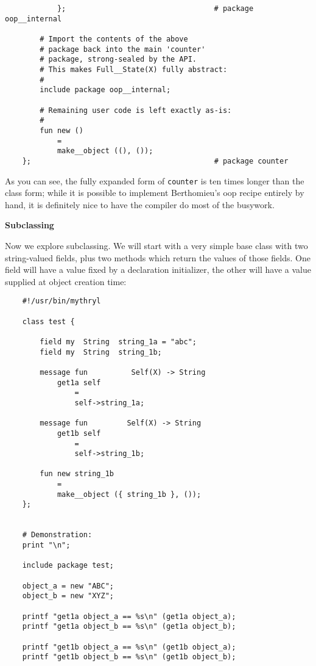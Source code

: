 \begin{verbatim}
            };                                  # package oop__internal

        # Import the contents of the above
        # package back into the main 'counter'
        # package, strong-sealed by the API.
        # This makes Full__State(X) fully abstract:
        #
        include package oop__internal;

        # Remaining user code is left exactly as-is:
        # 
        fun new ()
            =
            make__object ((), ());
    };                                          # package counter
\end{verbatim}

As you can see, the fully expanded form of {\tt counter} is ten times longer 
than the class form;  while it is possible to implement Berthomieu's oop recipe 
entirely by hand, it is definitely nice to have the compiler do most of the 
busywork.

{\bf Subclassing}

Now we explore subclassing.  We will start with a very simple base 
class with two string-valued fields, plus two methods which return the 
values of those fields.  One field will have a value fixed by a declaration 
initializer, the other will have a value supplied at object creation time:

\begin{verbatim}
    #!/usr/bin/mythryl

    class test {

        field my  String  string_1a = "abc";
        field my  String  string_1b;

        message fun          Self(X) -> String
            get1a self
                =
                self->string_1a;

        message fun         Self(X) -> String
            get1b self
                =
                self->string_1b;

        fun new string_1b
            =
            make__object ({ string_1b }, ());
    };


    # Demonstration:
    print "\n";

    include package test;

    object_a = new "ABC";
    object_b = new "XYZ";

    printf "get1a object_a == %s\n" (get1a object_a);
    printf "get1a object_b == %s\n" (get1a object_b);

    printf "get1b object_a == %s\n" (get1b object_a);
    printf "get1b object_b == %s\n" (get1b object_b);
\end{verbatim}

